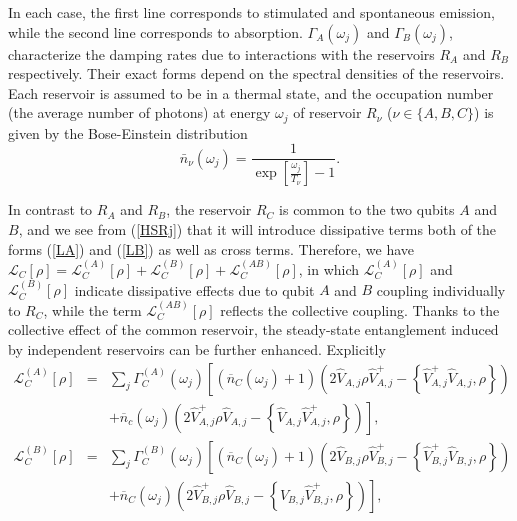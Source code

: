 \documentclass[12pt]{iopart}
\begin{document}
In each case, the first line corresponds to stimulated and spontaneous emission, while the second line corresponds to absorption. $\Gamma_{A}(\omega_{j})$ and $\Gamma_{B}(\omega_{j})$, characterize the damping rates due to interactions with the reservoirs $R_{A}$ and $R_{B}$ respectively. Their exact forms depend on the spectral densities of the reservoirs. Each reservoir is assumed to be in a thermal state, and the occupation number (the average number of photons) at energy $\omega_j$ of reservoir $R_\nu$ ($\nu \in\{A,B,C\}$) is given by the Bose-Einstein distribution
\begin{equation}
\label{n}
\bar{n}_{\nu}(\omega_{j})=\frac{1}{\exp[\frac{\omega_{j}}{T_{\nu}}]-1}.
\end{equation}

In contrast to $R_{A}$ and $R_{B}$, the reservoir $R_{C}$ is common to the two qubits $A$ and $B$, and we see from (\ref{HSRj}) that it will introduce dissipative terms both of the forms (\ref{LA}) and (\ref{LB}) as well as cross terms. Therefore, we have $\mathcal{L}_{C}[\rho]=\mathcal{L}_{C}^{(A)}[\rho]+\mathcal{L}_{C}^{(B)}[\rho]
+\mathcal{L}_{C}^{(AB)}[\rho]$, in which $\mathcal{L}_{C}^{(A)}[\rho]$ and $\mathcal{L}_{C}^{(B)}[\rho]$ indicate dissipative effects due to qubit $A$ and $B$ coupling individually to $R_{C}$, while the term $\mathcal{L}_{C}^{(AB)}[\rho]$ reflects the collective coupling. Thanks to the collective effect of the common reservoir, the steady-state entanglement induced by independent reservoirs can be further enhanced. Explicitly
\begin{eqnarray}
\label{LCA}
\mathcal{L}_{C}^{(A)}[\rho] &=& \sum_{j} \Gamma_{C}^{(A)}(\omega_{j})\left[ \left(\overline{n}_{C}(\omega_{j}) + 1\right)\left(2\hat{V}_{A,j}\rho \hat{V}_{A,j}^{+} - \left\{\hat{V}_{A,j}^{+}\hat{V}_{A,j},\rho\right\}\right) \right.\nonumber \\
&&\left. + \overline{n}_{c}(\omega_{j})\left(2\hat{V}_{A,j}^{+} \rho \hat{V}_{A,j} - \left\{\hat{V}_{A,j}\hat{V}_{A,j}^{+},\rho\right\}\right)\right] , \\
\label{LCB}
\mathcal{L}_{C}^{(B)}[\rho] &=& \sum_{j} \Gamma_{C}^{(B)}(\omega_{j})\left[ \left(\overline{n}_{C}(\omega_{j}) + 1\right)\left(2\hat{V}_{B,j}\rho \hat{V}_{B,j}^{+} - \left\{\hat{V}_{B,j}^{+}\hat{V}_{B,j},\rho\right\}\right) \right.\nonumber \\
&&\left. + \overline{n}_{C}(\omega_{j})\left(2\hat{V}_{B,j}^{+} \rho \hat{V}_{B,j} - \left\{\hat{V}_{B,j}\hat{V}_{B,j}^{+},\rho\right\}\right)\right] ,
\end{eqnarray}
\end{document}
